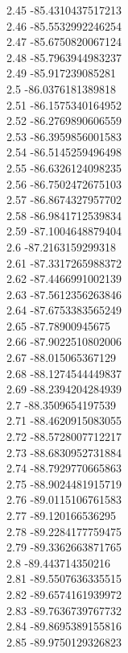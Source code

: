 {2.45	-85.4310437517213\\
2.46	-85.5532992246254\\
2.47	-85.6750820067124\\
2.48	-85.7963944983237\\
2.49	-85.917239085281\\
2.5	-86.0376181389818\\
2.51	-86.1575340164952\\
2.52	-86.2769890606559\\
2.53	-86.3959856001583\\
2.54	-86.5145259496498\\
2.55	-86.6326124098235\\
2.56	-86.7502472675103\\
2.57	-86.8674327957702\\
2.58	-86.9841712539834\\
2.59	-87.1004648879404\\
2.6	-87.2163159299318\\
2.61	-87.3317265988372\\
2.62	-87.4466991002139\\
2.63	-87.5612356263846\\
2.64	-87.6753383565249\\
2.65	-87.78900945675\\
2.66	-87.9022510802006\\
2.67	-88.015065367129\\
2.68	-88.1274544449837\\
2.69	-88.2394204284939\\
2.7	-88.3509654197539\\
2.71	-88.4620915083055\\
2.72	-88.5728007712217\\
2.73	-88.6830952731884\\
2.74	-88.7929770665863\\
2.75	-88.9024481915719\\
2.76	-89.0115106761583\\
2.77	-89.120166536295\\
2.78	-89.2284177759475\\
2.79	-89.3362663871765\\
2.8	-89.443714350216\\
2.81	-89.5507636335515\\
2.82	-89.6574161939972\\
2.83	-89.7636739767732\\
2.84	-89.8695389155816\\
2.85	-89.9750129326823\\
}
